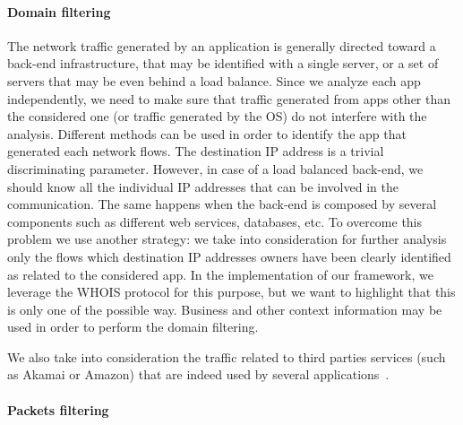 \documentclass{acm_proc_article-sp}
\newcommand{\hilight}[1]{#1}
\begin{document}
\paragraph{Domain filtering}
\label{Domain filtering}

\hilight{The network traffic generated by an application is generally directed toward a back-end infrastructure, that may be identified with a single server, or a set of servers that may be even behind a load balance. Since we analyze each app independently, we need to make 
sure that traffic generated from apps other than the considered one (or traffic generated by the OS) do not interfere with the 
analysis. Different methods can be used in order to identify the app that generated each network flows. The destination IP address is a trivial discriminating parameter. However, in case of a load balanced back-end, we should know all the individual IP addresses that can be involved in the communication. The same happens when the back-end is composed by several components such as different web services, databases, etc. To overcome this problem we use another strategy: we take into consideration for further analysis only the flows which destination IP addresses owners have been clearly identified as related to the considered app. In the implementation of our framework, we leverage the WHOIS protocol for this purpose, but we want to highlight that this is only one of the possible way. Business and other context information may be used in order to perform the domain filtering.
}
We also take into consideration the traffic related to third parties services (such as Akamai or Amazon) that are indeed used by several applications~\cite{Wei:2012:PMP:2348543.2348563}. 




\paragraph{Packets filtering}
\label{PacketFiltering}
\end{document}
